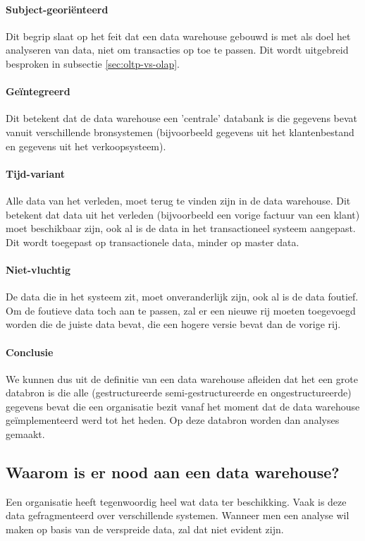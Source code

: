 \paragraph{Subject-georiënteerd}
Dit begrip slaat op het feit dat een data warehouse gebouwd is met als doel het analyseren van data, niet om transacties op toe te passen. Dit wordt uitgebreid besproken in subsectie \ref{sec:oltp-vs-olap}.


\paragraph{Geïntegreerd}
Dit betekent dat de data warehouse een 'centrale' databank is die gegevens bevat vanuit verschillende bronsystemen (bijvoorbeeld gegevens uit het klantenbestand en gegevens uit het verkoopsysteem). 

\paragraph{Tijd-variant}
Alle data van het verleden, moet terug te vinden zijn in de data warehouse. Dit betekent dat data uit het verleden (bijvoorbeeld een vorige factuur van een klant) moet beschikbaar zijn, ook al is de data in het transactioneel systeem aangepast. Dit wordt toegepast op transactionele data, minder op master data.

\paragraph{Niet-vluchtig}
De data die in het systeem zit, moet onveranderlijk zijn, ook al is de data foutief. Om de foutieve data toch aan te passen, zal er een nieuwe rij moeten toegevoegd worden die de juiste data bevat, die een hogere versie bevat dan de vorige rij. 

\paragraph{Conclusie}
We kunnen dus uit de definitie van een data warehouse afleiden dat het een grote databron is die alle (gestructureerde semi-gestructureerde en ongestructureerde) gegevens bevat die een organisatie bezit vanaf het moment dat de data warehouse geïmplementeerd werd tot het heden. Op deze databron worden dan analyses gemaakt.

\subsection{Waarom is er nood aan een data warehouse?}
Een organisatie heeft tegenwoordig heel wat data ter beschikking. Vaak is deze data gefragmenteerd over verschillende systemen. Wanneer men een analyse wil maken op basis van de verspreide data, zal dat niet evident zijn. 

